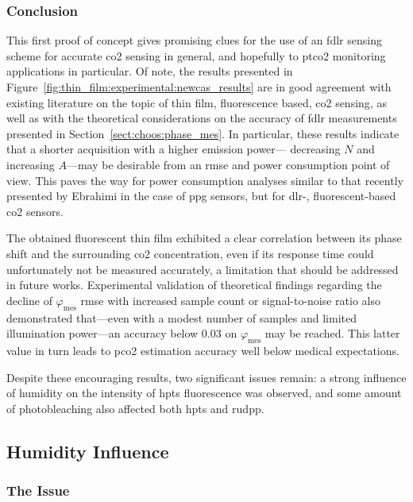\subsubsection{Conclusion}

This first proof of concept gives promising clues for the use of an \gls{fdlr} sensing scheme for accurate \gls{co2} sensing in general, and hopefully to \gls{ptco2} monitoring applications in particular. Of note, the results presented in Figure~\ref{fig:thin_film:experimental:newcas_results} are in good agreement with existing literature on the topic of thin film, fluorescence based, \gls{co2} sensing\cite{borisov2011}, as well as with the theoretical considerations on the accuracy of \gls{fdlr} measurements presented in Section~\ref{sect:choos:phase_mes}. In particular, these results indicate that a shorter acquisition with a higher emission power---\ie{} decreasing $N$ and increasing $A$---may be desirable from an \gls{rmse} and power consumption point of view. This paves the way for power consumption analyses similar to that recently presented by Ebrahimi \etal{} in the case of \gls{ppg} sensors\cite{ebrahimi2023}, but for \gls{dlr}-, fluorescent-based \gls{co2} sensors.

The obtained fluorescent thin film exhibited a clear correlation between its phase shift and the surrounding \gls{co2} concentration, even if its response time could unfortunately not be measured accurately, a limitation that should be addressed in future works. Experimental validation of theoretical findings regarding the decline of $\varphi_\text{mes}$ \gls{rmse} with increased sample count or signal-to-noise ratio also demonstrated that---even with a modest number of samples and limited illumination power---an accuracy below 0.03{\degree} on $\varphi_\text{mes}$ may be reached. This latter value in turn leads to \gls{pco2} estimation accuracy well below medical expectations.

Despite these encouraging results, two significant issues remain: a strong influence of humidity on the intensity of \gls{hpts} fluorescence was observed, and some amount of photobleaching also affected both \gls{hpts} and \gls{rudpp}.

\subsection{Humidity Influence}\label{sect:thin_film:experimental:humid}

\subsubsection{The Issue}

